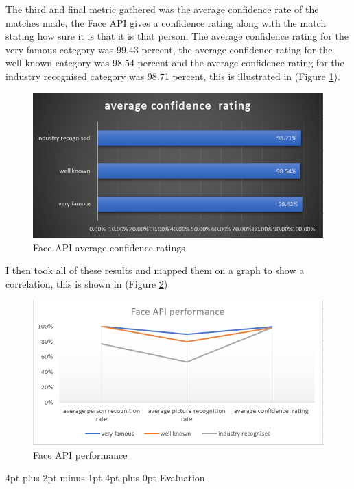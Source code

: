 \documentclass[12pt,a4paper]{article}
\makeatletter
\renewcommand\section{\@startsection {section}{1}{0mm} %
                               {4pt plus 2pt minus 1pt} %
                               {4pt plus 0pt} %
                               {\bfseries}}
\makeatother
\begin{document}
The third and final metric gathered was the average confidence rate of the matches made, the Face API gives a confidence rating along with the match stating how sure it is that it is that person. The average confidence rating for the very famous category was 99.43 percent, the average confidence rating for the well known category was 98.54 percent and the average confidence rating for the industry recognised category was 98.71 percent, this is illustrated in (Figure \ref{fer3}). 

\begin{figure}[h]
    \centering
    \includegraphics[width=1.0\textwidth]{Figs/faceevalr3.PNG} 
    \caption{Face API average confidence ratings} 
    \label{fer3}
\end{figure} 

I then took all of these results and mapped them on a graph to show a correlation, this is shown in (Figure \ref{fer4}) 

\begin{figure}[h]
    \centering
    \includegraphics[width=1.0\textwidth]{Figs/faceevalr4.PNG} 
    \caption{Face API performance} 
    \label{fer4}
\end{figure}

\section{Evaluation}
\end{document}
